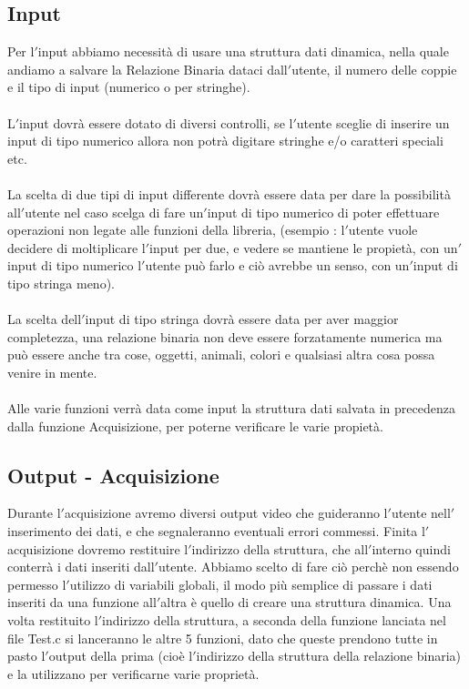 \documentclass[11pt, a4paper, titlepage, block]{article}
\begin{document}
	\subsection{Input}
	
	
	Per l$'$input abbiamo necessit\`a di usare una struttura dati dinamica, nella quale andiamo a salvare la Relazione Binaria dataci dall$'$utente, il numero delle coppie e il tipo di input (numerico o per stringhe).\\
	\\
	L$'$input dovr\`a essere dotato di diversi controlli, se l$'$utente sceglie di inserire un input di tipo numerico allora non potr\`a digitare stringhe e/o caratteri speciali etc.\\
	\\
	La scelta di due tipi di input differente dovr\`a essere data per dare la possibilit\`a all$'$utente nel caso scelga di fare un$'$input di tipo numerico di poter effettuare operazioni non legate alle funzioni della libreria, (esempio : l$'$utente vuole decidere di moltiplicare l$'$input per due, e vedere se mantiene le propiet\`a, con un$'$input di tipo numerico l$'$utente pu\`o farlo e ci\`o avrebbe un senso, con un$'$input di tipo stringa meno).\\
	\\
	La scelta dell$'$input di tipo stringa dovr\`a essere data per aver maggior completezza, una relazione binaria non deve essere forzatamente numerica ma pu\`o essere anche tra cose, oggetti, animali, colori e qualsiasi altra cosa possa venire in mente.\\
	\\
	Alle varie funzioni verr\`a data come input la struttura dati salvata in precedenza dalla funzione Acquisizione, per poterne verificare le varie propiet\`a.\\
	
	
	
	
	\newpage        
	\subsection{Output - Acquisizione}
	Durante l$'$acquisizione avremo diversi output video che guideranno l$'$utente nell$'$inserimento dei dati, e che segnaleranno eventuali errori commessi.
	Finita l$'$acquisizione dovremo restituire l$'$indirizzo della struttura, che all$'$interno quindi conterr\`a  i dati inseriti dall$'$utente. Abbiamo scelto di fare ci\`o perch\`e non essendo permesso l$'$utilizzo di variabili globali, il modo pi\`u semplice di passare i dati inseriti da una funzione all$'$altra \`e  quello di creare una struttura dinamica.
	Una volta restituito l$'$indirizzo della struttura, a seconda della funzione lanciata nel file Test.c si lanceranno le altre 5 funzioni, dato che queste prendono tutte in pasto l$'$output della prima (cio\`e l$'$indirizzo della struttura della relazione binaria) e la utilizzano per verificarne varie propriet\`a.\\
	\\
\end{document}

